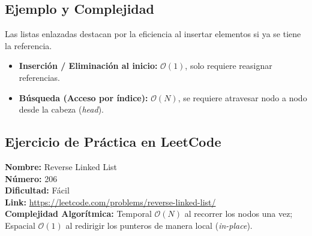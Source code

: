 \documentclass[12pt]{article}
\begin{document}
\subsection{Ejemplo y Complejidad}
Las listas enlazadas destacan por la eficiencia al insertar elementos si ya se tiene la referencia.
\begin{itemize}
    \item \textbf{Inserción / Eliminación al inicio:} $\mathcal{O}(1)$, solo requiere reasignar referencias.
    \item \textbf{Búsqueda (Acceso por índice):} $\mathcal{O}(N)$, se requiere atravesar nodo a nodo desde la cabeza (\textit{head}).
\end{itemize}

\subsection{Ejercicio de Práctica en LeetCode}
\textbf{Nombre:} Reverse Linked List \\
\textbf{Número:} 206 \\
\textbf{Dificultad:} Fácil \\
\textbf{Link:} \url{https://leetcode.com/problems/reverse-linked-list/} \\
\textbf{Complejidad Algorítmica:} Temporal $\mathcal{O}(N)$ al recorrer los nodos una vez; Espacial $\mathcal{O}(1)$ al redirigir los punteros de manera local (\textit{in-place}).
\end{document}

